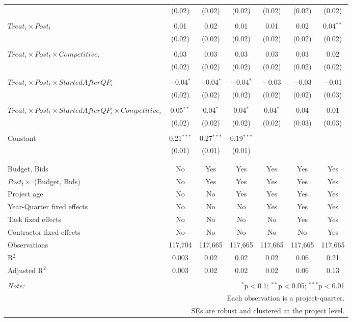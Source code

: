\documentclass[
]{article}
\begin{document}
\begin{table}[H]
\begin{tabular}{@{\extracolsep{-3pt}}lcccccc}
  & (0.02) & (0.02) & (0.02) & (0.02) & (0.02) & (0.02) \\ 
  & & & & & & \\ 
 $Treat_i \times Post_t$ & 0.01 & 0.02 & 0.01 & 0.01 & 0.02 & 0.04$^{**}$ \\ 
  & (0.02) & (0.02) & (0.02) & (0.02) & (0.02) & (0.02) \\ 
  & & & & & & \\ 
 $Treat_i \times Post_t \times Competitive_i$ & 0.03 & 0.03 & 0.03 & 0.03 & 0.03 & 0.02 \\ 
  & (0.02) & (0.02) & (0.02) & (0.02) & (0.02) & (0.02) \\ 
  & & & & & & \\ 
 $Treat_i \times Post_t \times StartedAfterQP_i$ & $-$0.04$^{*}$ & $-$0.04$^{*}$ & $-$0.04$^{*}$ & $-$0.03 & $-$0.03 & $-$0.01 \\ 
  & (0.02) & (0.02) & (0.02) & (0.02) & (0.02) & (0.03) \\ 
  & & & & & & \\ 
 $Treat_i \times Post_t \times StartedAfterQP_i \times Competitive_i$ & 0.05$^{**}$ & 0.04$^{*}$ & 0.04$^{*}$ & 0.04$^{*}$ & 0.04 & 0.01 \\ 
  & (0.02) & (0.02) & (0.02) & (0.02) & (0.03) & (0.03) \\ 
  & & & & & & \\ 
 Constant & 0.21$^{***}$ & 0.27$^{***}$ & 0.19$^{***}$ &  &  &  \\ 
  & (0.01) & (0.01) & (0.01) &  &  &  \\ 
  & & & & & & \\ 
\hline \\[-1.8ex] 
Budget, Bids & No & Yes & Yes & Yes & Yes & Yes \\ 
$Post_t \times $  (Budget, Bids) & No & Yes & Yes & Yes & Yes & Yes \\ 
Project age & No & No & Yes & Yes & Yes & Yes \\ 
Year-Quarter fixed effects & No & No & No & Yes & Yes & Yes \\ 
Task fixed effects & No & No & No & No & Yes & Yes \\ 
Contractor fixed effects & No & No & No & No & No & Yes \\ 
Observations & 117,704 & 117,665 & 117,665 & 117,665 & 117,665 & 117,665 \\ 
R$^{2}$ & 0.003 & 0.02 & 0.02 & 0.02 & 0.06 & 0.21 \\ 
Adjusted R$^{2}$ & 0.003 & 0.02 & 0.02 & 0.02 & 0.06 & 0.13 \\ 
\hline 
\hline \\[-1.8ex] 
\textit{Note:}  & \multicolumn{6}{r}{$^{*}$p$<$0.1; $^{**}$p$<$0.05; $^{***}$p$<$0.01} \\ 
 & \multicolumn{6}{r}{Each observation is a project-quarter.} \\ 
 & \multicolumn{6}{r}{SEs are robust and clustered at the project level.} \\ 
\end{tabular} 
\end{table}
\end{document}
